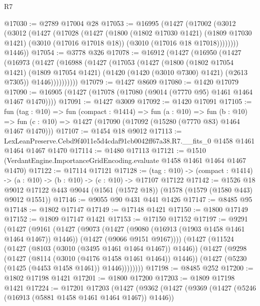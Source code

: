 \begin{lexlean}{R7}
\begin{coremodule}
@17030 := @2789 @17004 @28
@17053 := @16995
    (@1427
      (@17002
        (@3012
          (@3012
            (@1427
              (@17028
                (@1427
                  (@1800
                    (@1802 @17030 @1421)
                    (@1809 @17030 @1421)
                    (@3010 (@17016 @17018 @18))
                    (@3010 (@17016 @18 @17018))))))))
        @1446))
@17054 := @3778 @326
@17078 := @16912
    (@1427
      (@16950
        (@1427
          (@16973
            (@1427
              (@16988
                (@1427
                  (@17053
                    (@1427
                      (@1800
                        (@1802 @17054 @1421)
                        (@1809 @17054 @1421)
                        (@1420 (@1420 (@3010 @7300) @1421) (@2613 @7305))
                        @1446))))))))))
@17079 := @1427 @8609
@17080 := @1420 @17079
@17090 := @16905 (@1427 (@17078 (@17080 (@9014 (@7770 @95) @1461 @1464 @1467 @1470))))
@17091 := @1427 @3009
@17092 := @1420 @17091
@17105 := fun (tag : @10) =>
  fun (compact : @1414) =>
  fun (a : @10) =>
  fun (b : @10) => fun (c : @10) => @1427 (@17090 (@17092 (@15280 (@7770 @83) @1464 @1467 @1470)))
@17107 := @1454 @18 @9012
@17113 := LexLeanPreserve.Cebd9f4011e5d4cdaf91cb0042ff67a38.R7.__fits_0
    @1458
    @1461
    @1464
    @1467
    @1470
@17114 := @1480 @17113
@17121 := @1510 (VerdantEngine.ImportanceGridEncoding.evaluate @1458 @1461 @1464 @1467 @1470)
@17122 := @17114 @17121
@17128 := (tag : @10) -> (compact : @1414) -> (a : @10) -> (b : @10) -> (c : @10) -> @17107 @17122
@17142 := @1526
    @18
    @9012
    @17122
    @443
    @9044
    (@1561 (@1572 @18))
    (@1578 (@1579 (@1580 @443) @9012 @1551))
@17146 := @9055 @90 @431 @441 @1426
@17147 := @8485 @95
@17148 := @1802 @17147
@17149 := @17148 @1421
@17150 := @1800 @17149
@17152 := @1809 @17147 @1421
@17153 := @17150 @17152
@17197 := @9291
    (@1427
      (@9161
        (@1427
          (@9073
            (@1427 (@9080 (@16913 (@1903 @1458 @1461 @1464 @1467)) @1446))
            (@1427 (@9066 @9151 @9167))))
        (@1427
          (@11524
            (@1427 (@8103 (@3010 (@3495 @1461 @1464 @1467)) @1446))
            (@1427
              (@9298
                (@1427 (@8114 (@3010 (@4176 @1458 @1461 @1464)) @1446))
                (@1427 (@5230 (@1425 (@4453 @1458 @1461)) @1446))))))))
@17198 := @8485 @252
@17200 := @1802 @17198 @1421
@17201 := @1800 @17200
@17203 := @1809 @17198 @1421
@17224 := @17201
    @17203
    (@1427
      (@9362
        (@1427
          (@9369
            (@1427 (@5246 (@16913 (@5881 @1458 @1461 @1464 @1467)) @1446))

\end{coremodule}
\end{lexlean}
